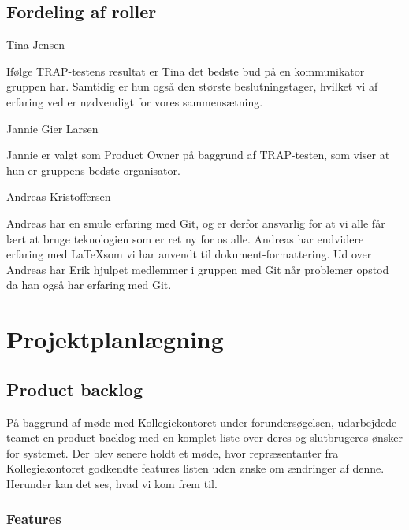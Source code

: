 \documentclass[12pt, a4paper]{report}
\begin{document}
\subsection{Fordeling af roller}

 Tina Jensen

Ifølge TRAP-testens resultat er Tina det bedste bud på en kommunikator gruppen har. Samtidig er hun også den største beslutningstager, hvilket vi af erfaring ved er nødvendigt for vores sammensætning.

 Jannie Gier Larsen

Jannie er valgt som Product Owner på baggrund af TRAP-testen, som viser at hun er gruppens bedste organisator.

 Andreas Kristoffersen

Andreas har en smule erfaring med Git, og er derfor ansvarlig for at vi alle får lært at bruge teknologien som er ret ny for os alle. Andreas har endvidere erfaring med \LaTeX som vi har anvendt til dokument-formattering. Ud over Andreas har Erik hjulpet medlemmer i gruppen med Git når problemer opstod da han også har erfaring med Git.


\section{Projektplanlægning}

\subsection{Product backlog}

På baggrund af møde med Kollegiekontoret under forundersøgelsen, udarbejdede teamet en product backlog med en komplet liste over deres og slutbrugeres ønsker for systemet. Der blev senere holdt et møde, hvor repræsentanter fra Kollegiekontoret godkendte features listen uden ønske om ændringer af denne. Herunder kan det ses, hvad vi kom frem til.

\subsubsection{Features}
\end{document}
